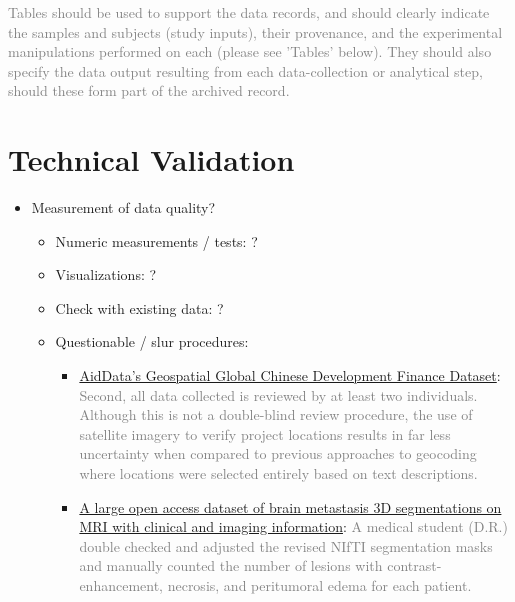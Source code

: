 \documentclass[fleqn,10pt]{wlscirep}
\begin{document}
\textcolor{gray}{Tables should be used to support the data records, and should clearly indicate the samples and subjects (study inputs), their provenance, and the experimental manipulations performed on each (please see 'Tables' below). They should also specify the data output resulting from each data-collection or analytical step, should these form part of the archived record.}

\section*{Technical Validation}

\begin{itemize}
  \item
  Measurement of data quality?
  
  \begin{itemize}
    \item
    Numeric measurements / tests: ?
    
    \item
    Visualizations: ?
    
    \item
    Check with existing data: ?
    
    \item
    Questionable / slur procedures:
      
      \begin{itemize}
      \item
      \href{https://www.nature.com/articles/s41597-024-03341-w?_gl=1*5ya8g2*_up*MQ..&gclid=EAIaIQobChMInOXO84DVhgMViewWBR3vWQJAEAAYASAAEgJICfD_BwE#Sec28}{AidData’s Geospatial Global Chinese Development Finance Dataset}: \textcolor{gray}{Second, all data collected is reviewed by at least two individuals. Although this is not a double-blind review procedure, the use of satellite imagery to verify project locations results in far less uncertainty when compared to previous approaches to geocoding where locations were selected entirely based on text descriptions.}
      
      \item
      \href{https://www.nature.com/articles/s41597-024-03021-9?_gl=1*1u1zppx*_up*MQ..&gclid=EAIaIQobChMInOXO84DVhgMViewWBR3vWQJAEAAYASAAEgJICfD_BwE#Sec9}{A large open access dataset of brain metastasis 3D segmentations on MRI with clinical and imaging information}: \textcolor{gray}{A medical student (D.R.) double checked and adjusted the revised NIfTI segmentation masks and manually counted the number of lesions with contrast-enhancement, necrosis, and peritumoral edema for each patient.}
      

\end{itemize}
\end{itemize}
\end{itemize}
\end{document}
